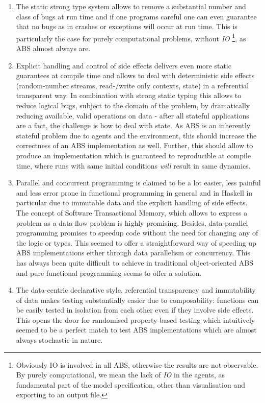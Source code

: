 \begin{enumerate}
	\item The static strong type system allows to remove a substantial number and class of bugs at run time and if one programs careful one can even guarantee that no bugs as in crashes or exceptions will occur at run time. This is particularly the case for purely computational problems, without \textit{IO} \footnote{Obviously IO is involved in all ABS, otherwise the results are not observable. By purely computational, we mean the lack of \textit{IO} in the agents, as fundamental part of the model specification, other than visualisation and exporting to an output file.}, as ABS almost always are. 
	
	\item Explicit handling and control of side effects delivers even more static guarantees at compile time and allows to deal with deterministic side effects (random-number streams, read-/write only contexts, state) in a referential transparent way. In combination with strong static typing this allows to reduce logical bugs, subject to the domain of the problem, by dramatically reducing available, valid operations on data - after all stateful applications are a fact, the challenge is how to deal with state. As ABS is an inherently stateful problem due to agents and the environment, this should increase the correctness of an ABS implementation as well. Further, this should allow to produce an implementation which is guaranteed to reproducible at compile time, where runs with same initial conditions \textit{will} result in same dynamics.
	
	\item Parallel and concurrent programming is claimed to be a lot easier, less painful and less error prone in functional programming in general and in Haskell in particular due to immutable data and the explicit handling of side effects. The concept of Software Transactional Memory, which allows to express a problem as a data-flow problem is highly promising. Besides, data-parallel programming promises to speedup code without the need for changing any of the logic or types. This seemed to offer a straightforward way of speeding up ABS implementations either through data parallelism or concurrency. This has always been quite difficult to achieve in traditional object-oriented ABS and pure functional programming seems to offer a solution.
	
	\item The data-centric declarative style, referential transparency and immutability of data makes testing substantially easier due to composability: functions can be easily tested in isolation from each other even if they involve side effects. This opens the door for randomised property-based testing which intuitively seemed to be a perfect match to test ABS implementations which are almost always stochastic in nature.
\end{enumerate}

